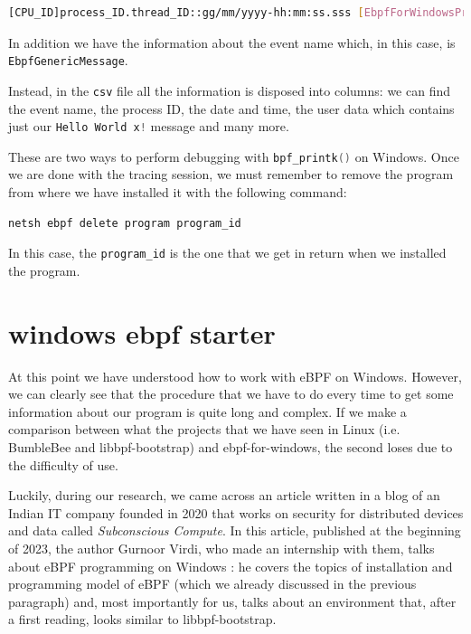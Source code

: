 \begin{lstlisting}[style=commandline, language=bash, caption={tracelog kernel debugging message output}]
	[CPU_ID]process_ID.thread_ID::gg/mm/yyyy-hh:mm:ss.sss [EbpfForWindowsProvider/EbpfGenericMessage]{"Message":"Hello World x!"}
\end{lstlisting}

In addition we have the information about the event name which, in this case, is \colorbox{backcolour}{\lstinline[style=cstyle, language=C]|EbpfGenericMessage|}.

Instead, in the \colorbox{backcolour}{\lstinline[style=cstyle, language=C]|csv|} file all the information is disposed into columns: we can find the event name, the process ID, the date and time, the user data which contains just our \colorbox{backcolour}{\lstinline[style=cstyle, language=C]|Hello World x!|} message and many more. 

These are two ways to perform debugging with \colorbox{backcolour}{\lstinline[style=cstyle, language=C]|bpf_printk()|} on Windows.
Once we are done with the tracing session, we must remember to remove the program from where we have installed it with the following command:

\begin{lstlisting}[style=commandline, language=bash, caption={``Hello world!'' delete command}]
	netsh ebpf delete program program_id
\end{lstlisting}

In this case, the \colorbox{backcolour}{\lstinline[style=cstyle, language=C]|program_id|} is the one that we get in return when we installed the program.

\section{windows ebpf starter}

At this point we have understood how to work with eBPF on Windows.
However, we can clearly see that the procedure that we have to do every time to get some information about our program is quite long and complex.
If we make a comparison between what the projects that we have seen in Linux (i.e. BumbleBee and libbpf-bootstrap) and ebpf-for-windows, the second loses due to the difficulty of use.

Luckily, during our research, we came across an article written in a blog of an Indian IT company founded in 2020 that works on security for distributed devices and data called \textit{Subconscious Compute}.
In this article, published at the beginning of 2023, the author Gurnoor Virdi, who made an internship with them, talks about eBPF programming on Windows \cite{eBPFWinSubComBlogArticle}: he covers the topics of installation and programming model of eBPF (which we already discussed in the previous paragraph) and, most importantly for us, talks about an environment that, after a first reading, looks similar to libbpf-bootstrap.

